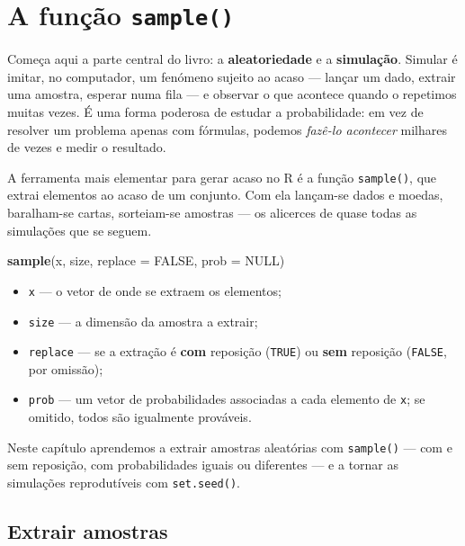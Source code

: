\documentclass[
  portuguese,
  11pt,
  openany]{book}
\newenvironment{Shaded}{\begin{snugshade}}{\end{snugshade}}
\newcommand{\AttributeTok}[1]{\textcolor[rgb]{0.13,0.29,0.53}{#1}}
\newcommand{\ConstantTok}[1]{\textcolor[rgb]{0.56,0.35,0.01}{#1}}
\newcommand{\FunctionTok}[1]{\textcolor[rgb]{0.13,0.29,0.53}{\textbf{#1}}}
\newcommand{\NormalTok}[1]{#1}
\providecommand{\tightlist}{%
  \setlength{\itemsep}{0pt}\setlength{\parskip}{0pt}}
\begin{document}
\chapter{\texorpdfstring{A função \texttt{sample()}}{A função sample()}}\label{sample}

Começa aqui a parte central do livro: a \textbf{aleatoriedade} e a \textbf{simulação}. Simular é
imitar, no computador, um fenómeno sujeito ao acaso --- lançar um dado, extrair uma
amostra, esperar numa fila --- e observar o que acontece quando o repetimos muitas vezes.
É uma forma poderosa de estudar a probabilidade: em vez de resolver um problema apenas
com fórmulas, podemos \emph{fazê-lo acontecer} milhares de vezes e medir o resultado.

A ferramenta mais elementar para gerar acaso no R é a função \texttt{sample()}, que extrai
elementos ao acaso de um conjunto. Com ela lançam-se dados e moedas, baralham-se
cartas, sorteiam-se amostras --- os alicerces de quase todas as simulações que se seguem.

\begin{Shaded}
\begin{Highlighting}[]
\FunctionTok{sample}\NormalTok{(x, size, }\AttributeTok{replace =} \ConstantTok{FALSE}\NormalTok{, }\AttributeTok{prob =} \ConstantTok{NULL}\NormalTok{)}
\end{Highlighting}
\end{Shaded}

\begin{itemize}
\tightlist
\item
  \texttt{x} --- o vetor de onde se extraem os elementos;
\item
  \texttt{size} --- a dimensão da amostra a extrair;
\item
  \texttt{replace} --- se a extração é \textbf{com} reposição (\texttt{TRUE}) ou \textbf{sem} reposição
  (\texttt{FALSE}, por omissão);
\item
  \texttt{prob} --- um vetor de probabilidades associadas a cada elemento de \texttt{x}; se omitido,
  todos são igualmente prováveis.
\end{itemize}

Neste capítulo aprendemos a extrair amostras aleatórias com \texttt{sample()} --- com e sem
reposição, com probabilidades iguais ou diferentes --- e a tornar as simulações
reprodutíveis com \texttt{set.seed()}.

\section{Extrair amostras}\label{extrair-amostras}
\end{document}
